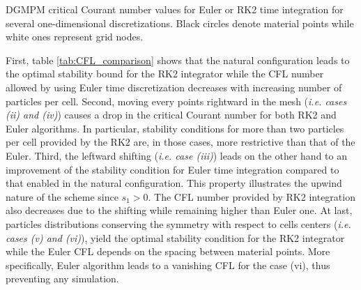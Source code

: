 \begin{table}[h!]
  \centering
  
  \caption{DGMPM critical Courant number values for Euler or RK2 time integration for several one-dimensional discretizations. Black circles denote material points while white ones represent grid nodes.}
  \label{tab:CFL_comparison}
\end{table}
First, table \ref{tab:CFL_comparison} shows that the natural configuration leads to the optimal stability bound for the RK2 integrator while the CFL number allowed by using Euler time discretization decreases with increasing number of particles per cell.
Second, moving every points rightward in the mesh (\textit{i.e. cases (ii) and (iv)}) causes a drop in the critical Courant number for both RK2 and Euler algorithms. In particular, stability conditions for more than two particles per cell provided by the RK2 are, in those cases, more restrictive than that of the Euler.
Third, the leftward shifting (\textit{i.e. case (iii)}) leads on the other hand to an improvement of the stability condition for Euler time integration compared to that enabled in the natural configuration.
This property illustrates the upwind nature of the scheme since $s_1>0$.
The CFL number provided by RK2 integration also decreases due to the shifting while remaining higher than Euler one.
At last, particles distributions conserving the symmetry with respect to cells centers (\textit{i.e. cases (v) and (vi)}), yield the optimal stability condition for the RK2 integrator while the Euler CFL depends on the spacing between material points.
More specifically, Euler algorithm leads to a vanishing CFL for the case (vi), thus preventing any simulation.

